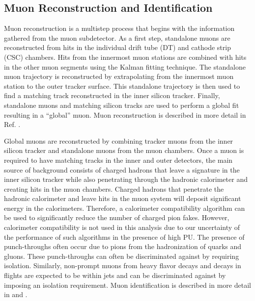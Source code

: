 \subsection{Muon Reconstruction and Identification}\label{ss:muonreco}

Muon reconstruction is a multistep process that begins with the information gathered from the muon subdetector. As a
first step, standalone muons are reconstructed from hits in the individual drift tube (DT) and
cathode strip (CSC) chambers. Hits from the innermost muon stations are combined with hits in the other muon segments
using the Kalman fitting technique\cite{Kalman}. The standalone muon trajectory is reconstructed by extrapolating from the
innermost muon station to the outer tracker surface. This standalone trajectory is then used to find a matching track
reconstructed in the inner silicon tracker. Finally, standalone muons and matching silicon tracks are used to perform a
global fit resulting in a ``global'' muon. Muon reconstruction is described in more detail in Ref. \cite{CMS_MUO_10-004}.

Global muons are reconstructed by combining tracker muons from the inner silicon tracker and standalone muons from the
muon chambers. Once a muon is required to have matching tracks in the inner and outer detectors,
the main source of background consists of charged hadrons that leave a
signature in the inner silicon tracker while also penetrating through the hadronic calorimeter and creating hits in the
muon chambers. Charged hadrons that penetrate the hadronic calorimeter and leave hits in the muon system will deposit 
significant energy in the calorimeters. Therefore, a calorimeter compatibility algorithm can be used to significantly 
reduce the number of charged pion fakes. However, calorimeter compatibility is not used in this analysis due to our 
uncertainty of the performance of such algorithms in the presence of high PU. 
The presence of punch-throughs often occur due to pions from the hadronization of quarks and gluons. These punch-throughs 
can often be discriminated against by requiring isolation. Similarly, non-prompt muons from heavy flavor decays and 
decays in flights are expected to be within jets and can be discriminated against by imposing an isolation requirement. 
Muon identification is described in more detail in \cite{CMS_MUO_10-004} and \cite{CMS_MUO_11-001}.

